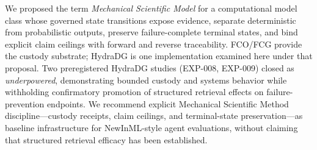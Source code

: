 \documentclass{article}
\begin{document}
We proposed the term \emph{Mechanical Scientific Model} for a computational model class whose governed state transitions expose evidence, separate deterministic from probabilistic outputs, preserve failure-complete terminal states, and bind explicit claim ceilings with forward and reverse traceability.
FCO/FCG provide the custody substrate; HydraDG is one implementation examined here under that proposal.
Two preregistered HydraDG studies (EXP-008, EXP-009) closed as \emph{underpowered}, demonstrating bounded custody and systems behavior while withholding confirmatory promotion of structured retrieval effects on failure-prevention endpoints.
We recommend explicit Mechanical Scientific Method discipline---custody receipts, claim ceilings, and terminal-state preservation---as baseline infrastructure for NewInML-style agent evaluations, without claiming that structured retrieval efficacy has been established.
\end{document}
